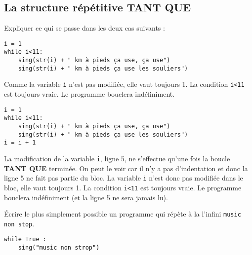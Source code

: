 \subsection{La structure répétitive \textbf{TANT QUE}}
\begin{cor}
Expliquer ce qui se passe dans les deux cas suivants :
\begin{multicols}{2}
\begin{lstlisting}
i = 1
while i<11:
	sing(str(i) + " km à pieds ça use, ça use") 
	sing(str(i) + " km à pieds ça use les souliers")
\end{lstlisting}
\columnbreak
Comme la variable \texttt{i} n'est pas modifiée, elle vaut toujours 1. La condition \texttt{i<11} est toujours vraie. Le programme bouclera indéfiniment.
\end{multicols}
\begin{multicols}{2}
\begin{lstlisting}
i = 1
while i<11:
	sing(str(i) + " km à pieds ça use, ça use") 
	sing(str(i) + " km à pieds ça use les souliers")
i = i + 1
\end{lstlisting}
\columnbreak
La modification de la variable \texttt{i}, ligne 5, ne s'effectue qu'une fois la boucle \textbf{TANT QUE} terminée. On peut le voir car il n'y a pas d'indentation et donc la ligne 5 ne fait pas partie du bloc. La variable \texttt{i} n'est donc pas modifiée dans le bloc, elle vaut toujours 1. La condition \texttt{i<11} est toujours vraie. Le programme bouclera indéfiniment (et la ligne 5 ne sera jamais lu).
\end{multicols}
\end{cor}

\begin{cor}
\begin{multicols}{2}
Écrire le plus simplement possible un programme qui répète à la l'infini \texttt{music non stop}.\\
\columnbreak
\begin{lstlisting}
while True :
	sing("music non strop")
\end{lstlisting}
\end{multicols}
\end{cor}


